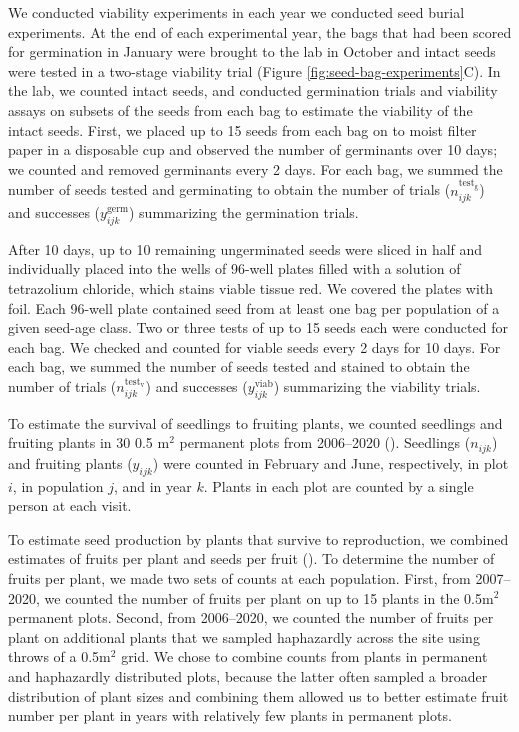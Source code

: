 \documentclass[12pt, oneside, titlepage]{article}   	%
\begin{document}
{We conducted viability experiments in each year we conducted seed burial experiments. At the end of each experimental year, the bags that had been scored for germination in January were brought to the lab in October and intact seeds were tested in a two-stage viability trial (Figure \ref{fig:seed-bag-experiments}C). In the lab, we counted intact seeds, and conducted germination trials and viability assays on subsets of the seeds from each bag to estimate the viability of the intact seeds. First, we placed up to 15 seeds from each bag on to moist filter paper in a disposable cup and observed the number of germinants over 10 days; we counted and removed germinants every 2 days. For each bag, we summed the number of seeds tested and germinating to obtain the number of trials ($n^\mathrm{test_g}_{ijk}$) and successes ($y^{\mathrm{germ}}_{ijk}$) summarizing the germination trials. 

After 10 days, up to 10 remaining ungerminated seeds were sliced in half and individually placed into the wells of 96-well plates filled with a solution of tetrazolium chloride, which stains viable tissue red. We covered the plates with foil. Each 96-well plate contained seed from at least one bag per population of a given seed-age class. Two or three tests of up to 15 seeds each were conducted for each bag. We checked and counted for viable seeds  every 2 days for 10 days. For each bag, we summed the number of seeds tested and stained to obtain the number of trials ($n^\mathrm{test_v}_{ijk}$) and successes ($y^{\mathrm{viab}}_{ijk}$) summarizing the viability trials. 

To estimate the survival of seedlings to fruiting plants, we counted seedlings and fruiting plants in 30 0.5 m$^2$ permanent plots from 2006--2020 (\cite{eckhart2011}). Seedlings ($n_{ijk}$) and fruiting plants ($y_{ijk}$) were counted in February and June, respectively, in plot $i$, in population $j$, and in year $k$. Plants in each plot are counted by a single person at each visit. 

To estimate seed production by plants that survive to reproduction, we combined estimates of fruits per plant and seeds per fruit (\cite{eckhart2011}). To determine the number of fruits per plant, we made two sets of counts at each population. First, from 2007--2020, we counted the number of fruits per plant on up to 15 plants in the 0.5m$^2$ permanent plots. Second, from 2006--2020, we counted the number of fruits per plant on additional plants that we sampled haphazardly across the site using throws of a 0.5m$^2$ grid. We chose to combine counts from plants in permanent and haphazardly distributed plots, because the latter often sampled a broader distribution of plant sizes and combining them allowed us to better estimate fruit number per plant in years with relatively few plants in permanent plots. 

}
\end{document}
